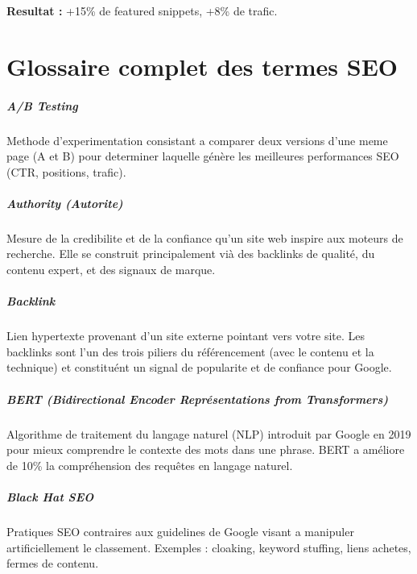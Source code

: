 \textbf{Resultat :} +15\% de featured snippets, +8\% de trafic.


\chapter*{Glossaire complet des termes SEO}

\onehalfspacing

\paragraph*{A/B Testing}
Methode d'experimentation consistant a comparer deux versions d'une meme page (A et B) pour determiner laquelle génère les meilleures performances SEO (CTR, positions, trafic).

\paragraph*{Authority (Autorite)}
Mesure de la credibilite et de la confiance qu'un site web inspire aux moteurs de recherche. Elle se construit principalement vià des backlinks de qualité, du contenu expert, et des signaux de marque.

\paragraph*{Backlink}
Lien hypertexte provenant d'un site externe pointant vers votre site. Les backlinks sont l'un des trois piliers du référencement (avec le contenu et la technique) et constituént un signal de popularite et de confiance pour Google.

\paragraph*{BERT (Bidirectional Encoder Représentations from Transformers)}
Algorithme de traitement du langage naturel (NLP) introduit par Google en 2019 pour mieux comprendre le contexte des mots dans une phrase. BERT a améliore de 10\% la compréhension des requêtes en langage naturel.

\paragraph*{Black Hat SEO}
Pratiques SEO contraires aux guidelines de Google visant a manipuler artificiellement le classement. Exemples : cloaking, keyword stuffing, liens achetes, fermes de contenu.

